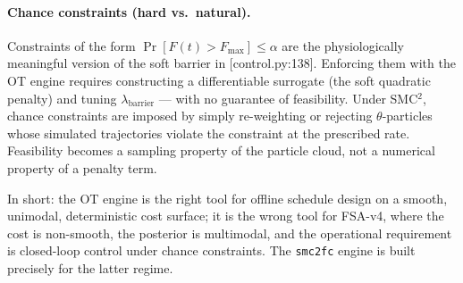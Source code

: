\paragraph{Chance constraints (hard vs.\ natural).} Constraints of the form $\Pr[F(t) > F_{\max}] \le \alpha$ are the physiologically meaningful version of the soft barrier in [control.py:138]. Enforcing them with the OT engine requires constructing a differentiable surrogate (the soft quadratic penalty) and tuning $\lambda_{\text{barrier}}$ --- with no guarantee of feasibility. Under SMC$^2$, chance constraints are imposed by simply re-weighting or rejecting $\theta$-particles whose simulated trajectories violate the constraint at the prescribed rate. Feasibility becomes a sampling property of the particle cloud, not a numerical property of a penalty term.

In short: the OT engine is the right tool for offline schedule design on a smooth, unimodal, deterministic cost surface; it is the wrong tool for FSA-v4, where the cost is non-smooth, the posterior is multimodal, and the operational requirement is closed-loop control under chance constraints. The \texttt{smc2fc} engine is built precisely for the latter regime.
